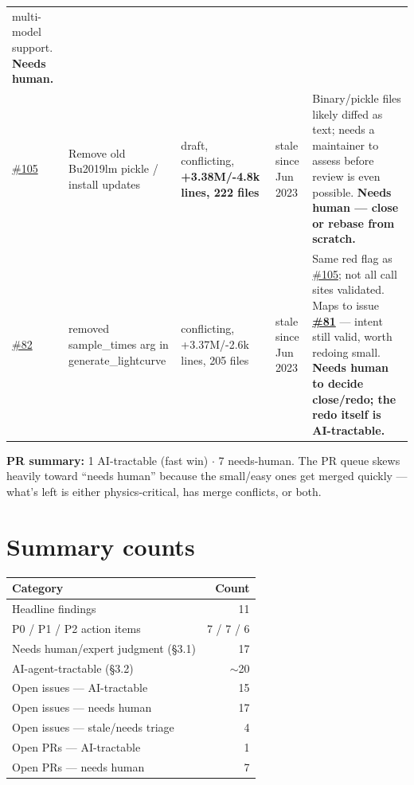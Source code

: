 \documentclass[10pt]{article}
\begin{document}
\begin{longtable}{@{}p{1.2cm}p{3.3cm}p{2.6cm}p{2.6cm}p{4.4cm}@{}}
  multi-model support. \textbf{Needs human.} \\[4pt]
\href{https://github.com/nuclear-multimessenger-astronomy/nmma/issues/105}{\#105} & Remove old Bu2019lm pickle / install updates & draft, conflicting,
  \textbf{+3.38M/-4.8k lines, 222 files} & stale since Jun 2023 & Binary/pickle
  files likely diffed as text; needs a maintainer to assess before review is even
  possible. \textbf{Needs human --- close or rebase from scratch.} \\[4pt]
\href{https://github.com/nuclear-multimessenger-astronomy/nmma/issues/82}{\#82} & removed sample\_times arg in generate\_lightcurve & conflicting,
  +3.37M/-2.6k lines, 205 files & stale since Jun 2023 & Same red flag as \href{https://github.com/nuclear-multimessenger-astronomy/nmma/issues/105}{\#105};
  not all call sites validated. Maps to issue \textbf{\href{https://github.com/nuclear-multimessenger-astronomy/nmma/issues/81}{\#81}} --- intent still
  valid, worth redoing small. \textbf{Needs human to decide close/redo; the redo
  itself is AI-tractable.} \\
\bottomrule
\end{longtable}
\endgroup

\noindent\textbf{PR summary:} 1 AI-tractable (fast win) $\cdot$ 7 needs-human. The
PR queue skews heavily toward ``needs human'' because the small/easy ones get
merged quickly --- what's left is either physics-critical, has merge conflicts, or
both.

\section{Summary counts}

\begin{center}
\small
\begin{tabular}{@{}lr@{}}
\toprule
\textbf{Category} & \textbf{Count} \\
\midrule
Headline findings & 11 \\
P0 / P1 / P2 action items & 7 / 7 / 6 \\
Needs human/expert judgment (\S3.1) & 17 \\
AI-agent-tractable (\S3.2) & $\sim$20 \\
Open issues --- AI-tractable & 15 \\
Open issues --- needs human & 17 \\
Open issues --- stale/needs triage & 4 \\
Open PRs --- AI-tractable & 1 \\
Open PRs --- needs human & 7 \\
\bottomrule
\end{tabular}
\end{center}
\end{document}

